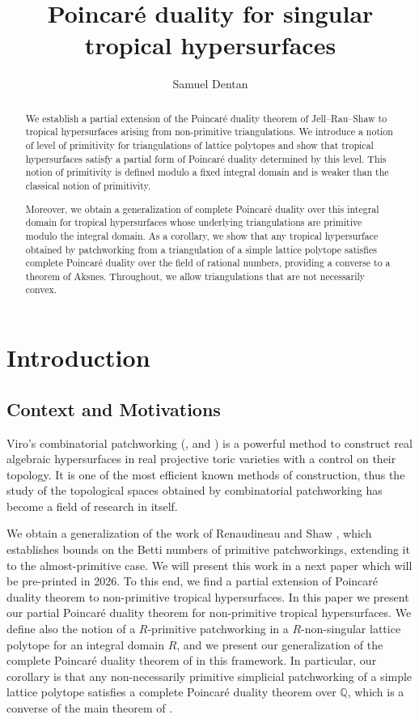 \documentclass{article}
\title{Poincaré duality for singular tropical hypersurfaces}
\author{Samuel Dentan}
\date{}
\begin{document}
\maketitle

\begin{abstract}
    We establish a partial extension of the Poincaré duality theorem of Jell–Rau–Shaw to tropical hypersurfaces arising from non-primitive triangulations. We introduce a notion of level of primitivity for triangulations of lattice polytopes and show that tropical hypersurfaces satisfy a partial form of Poincaré duality determined by this level. This notion of primitivity is defined modulo a fixed integral domain and is weaker than the classical notion of primitivity.
    
    Moreover, we obtain a generalization of complete Poincaré duality over this integral domain for tropical hypersurfaces whose underlying triangulations are primitive modulo the integral domain. As a corollary, we show that any tropical hypersurface obtained by patchworking from a triangulation of a simple lattice polytope satisfies complete Poincaré duality over the field of rational numbers, providing a converse to a theorem of Aksnes. Throughout, we allow triangulations that are not necessarily convex.
\end{abstract}

\tableofcontents
\newpage

\section{Introduction}

\subsection{Context and Motivations}

Viro’s combinatorial patchworking (\cite{Vi 1984}, \cite{Vi 2006} and \cite{Ri 1993}) is a powerful method to construct real algebraic hypersurfaces in real projective toric varieties with a control on their topology. It is one of the most efficient known methods of construction, thus the study of the topological spaces obtained by combinatorial patchworking has become a field of research in itself.

We obtain a generalization of the work of Renaudineau and Shaw \cite{RS 2023}, which establishes bounds on the Betti numbers of primitive patchworkings, extending it to the almost-primitive case. We will present this work in a next paper which will be pre-printed in 2026. To this end, we find a partial extension of Poincaré duality theorem to non-primitive tropical hypersurfaces. In this paper we present our partial Poincaré duality theorem for non-primitive tropical hypersurfaces. We define also the notion of a $R$-primitive patchworking in a $R$-non-singular lattice polytope for an integral domain $R$, and we present our generalization of the complete Poincaré duality theorem of \cite{JRS 2018} in this framework. In particular, our corollary is that any non-necessarily primitive simplicial patchworking of a simple lattice polytope satisfies a complete Poincaré duality theorem over $\mathbb{Q}$, which is a converse of the main theorem of \cite{Ak 2023}.
\end{document}
